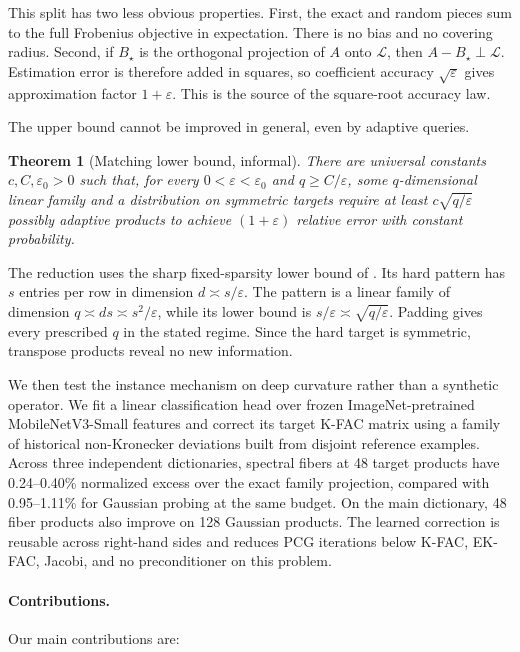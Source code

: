\documentclass{article}
\newtheorem{theorem}{Theorem}
\theoremstyle{remark}
\newcommand{\cL}{\mathcal L}
\newcommand{\eps}{\varepsilon}
\newcommand{\1}{\mathbf 1}
\begin{document}
This split has two less obvious properties.  First, the exact and random pieces sum to the full Frobenius objective in expectation.  There is no bias and no covering radius.  Second, if $B_\star$ is the orthogonal projection of $A$ onto $\cL$, then $A-B_\star\perp\cL$.  Estimation error is therefore added in squares, so coefficient accuracy $\sqrt\eps$ gives approximation factor $1+\eps$.  This is the source of the square-root accuracy law.

The upper bound cannot be improved in general, even by adaptive queries.

\begin{theorem}[Matching lower bound, informal]
\label{thm:intro-lower}
There are universal constants $c,C,\eps_0>0$ such that, for every $0<\eps<\eps_0$ and $q\ge C/\eps$, some $q$-dimensional linear family and a distribution on symmetric targets require at least $c\sqrt{q/\eps}$ possibly adaptive products to achieve $(1+\eps)$ relative error with constant probability.
\end{theorem}

The reduction uses the sharp fixed-sparsity lower bound of \citet{amsel2026fixed}.  Its hard pattern has $s$ entries per row in dimension $d\asymp s/\eps$.  The pattern is a linear family of dimension $q\asymp ds\asymp s^2/\eps$, while its lower bound is $s/\eps\asymp\sqrt{q/\eps}$.  Padding gives every prescribed $q$ in the stated regime.  Since the hard target is symmetric, transpose products reveal no new information.

We then test the instance mechanism on deep curvature rather than a synthetic operator.  We fit a linear classification head over frozen ImageNet-pretrained MobileNetV3-Small features and correct its target K-FAC matrix using a family of historical non-Kronecker deviations built from disjoint reference examples. Across three independent dictionaries, spectral fibers at 48 target products have 0.24--0.40\% normalized excess over the exact family projection, compared with 0.95--1.11\% for Gaussian probing at the same budget.  On the main dictionary, 48 fiber products also improve on 128 Gaussian products.  The learned correction is reusable across right-hand sides and reduces PCG iterations below K-FAC, EK-FAC, Jacobi, and no preconditioner on this problem.

\paragraph{Contributions.}
Our main contributions are:
\end{document}
